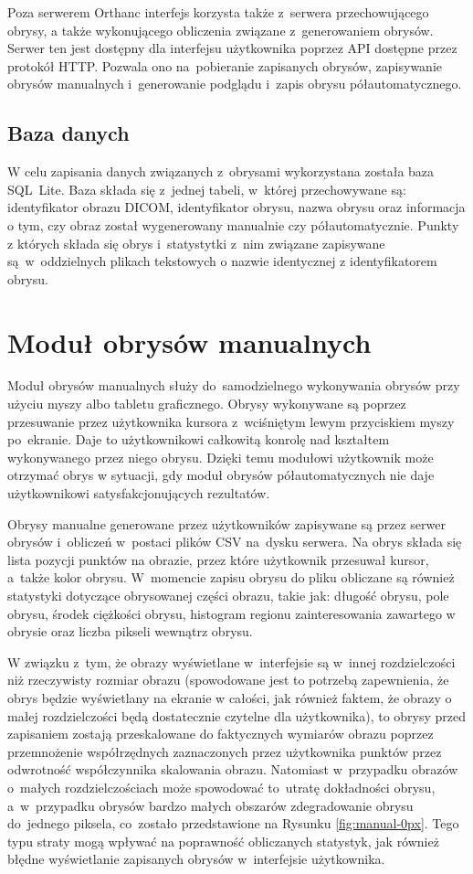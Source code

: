 \documentclass[a4paper,11pt,twoside,openright]{report}
\theoremstyle{definition}
\begin{document}
Poza serwerem Orthanc interfejs korzysta także z~serwera przechowującego obrysy,
a także wykonującego obliczenia związane z~generowaniem obrysów. Serwer ten jest
dostępny dla interfejsu użytkownika poprzez API dostępne przez protokół HTTP.
Pozwala ono na~pobieranie zapisanych obrysów, zapisywanie obrysów manualnych
i~generowanie podglądu i~zapis obrysu półautomatycznego.

\subsection {Baza danych}

W celu zapisania danych związanych z~obrysami wykorzystana została baza SQL~Lite.
Baza składa się z~jednej tabeli, w~której przechowywane są: identyfikator obrazu DICOM,
identyfikator obrysu, nazwa obrysu oraz informacja o tym, czy obraz został wygenerowany
manualnie czy półautomatycznie. Punkty z których składa się obrys i~statystytki
z~nim związane zapisywane są~w~oddzielnych
plikach tekstowych o nazwie identycznej z identyfikatorem obrysu.

\section {Moduł obrysów manualnych}

Moduł obrysów manualnych służy do~samodzielnego wykonywania obrysów przy użyciu myszy albo tabletu
graficznego. Obrysy wykonywane są poprzez przesuwanie przez użytkownika kursora
z~wciśniętym lewym przyciskiem myszy po~ekranie. Daje to użytkownikowi całkowitą
konrolę nad kształtem wykonywanego przez niego obrysu. Dzięki temu modułowi
użytkownik może otrzymać obrys w sytuacji,
gdy moduł obrysów półautomatycznych nie daje użytkownikowi satysfakcjonujących rezultatów.

Obrysy manualne generowane przez użytkowników zapisywane są przez serwer obrysów
i~obliczeń w~postaci plików CSV na~dysku serwera. Na obrys składa się lista
pozycji punktów na obrazie, przez które użytkownik przesuwał kursor, a~także kolor obrysu.
W~momencie zapisu obrysu do pliku obliczane są
również statystyki dotyczące obrysowanej części obrazu, takie jak: długość obrysu,
pole obrysu, środek ciężkości obrysu, histogram regionu zainteresowania zawartego w obrysie oraz
liczba pikseli wewnątrz obrysu.

W związku z~tym, że obrazy wyświetlane w~interfejsie są w~innej rozdzielczości
niż rzeczywisty rozmiar obrazu (spowodowane jest to potrzebą zapewnienia, że obrys
będzie wyświetlany na ekranie w całości, jak również faktem, że obrazy o małej rozdzielczości
będą dostatecznie czytelne dla użytkownika), to obrysy przed zapisaniem zostają przeskalowane do
faktycznych wymiarów obrazu poprzez przemnożenie współrzędnych zaznaczonych przez
użytkownika punktów przez odwrotność współczynnika skalowania obrazu.
Natomiast w~przypadku obrazów o~małych rozdzielczościach może
spowodować to~utratę dokładności obrysu, a~w~przypadku obrysów bardzo małych
obszarów zdegradowanie obrysu do~jednego piksela, co~zostało przedstawione na Rysunku
\ref{fig:manual-0px}. Tego typu straty mogą wpływać
na poprawność obliczanych statystyk, jak również błędne wyświetlanie zapisanych
obrysów w~interfejsie użytkownika.
\end{document}
